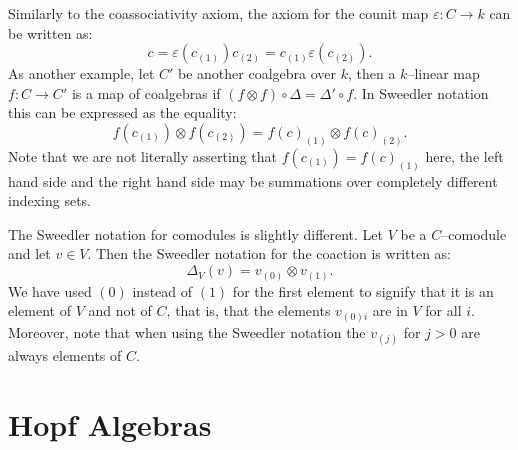\documentclass{article}
\theoremstyle{plain}
\theoremstyle{definition}
\begin{document}
Similarly to the coassociativity axiom, the axiom for the counit map $\varepsilon: C\to k$ can be written as: 
\[
c=\varepsilon(c_{(1)})c_{(2)}=c_{(1)}\varepsilon(c_{(2)}). 
\]
As another example, let $C'$ be another coalgebra over $k$, then a $k$--linear map $f:C\to C'$ is a map of coalgebras if $(f\otimes f)\circ \Delta =\Delta' \circ f$. In Sweedler notation this can be expressed as the equality: 
\[
f(c_{(1)})\otimes f(c_{(2)}) = f(c)_{(1)}\otimes f(c)_{(2)}.
\]
Note that we are not literally asserting that $f(c_{(1)})=f(c)_{(1)}$ here, the left hand side and the right hand side may be summations over completely different indexing sets. 

The Sweedler notation for comodules is slightly different. Let $V$ be a $C$--comodule and let $v\in V$. Then the Sweedler notation for the coaction is written as: 
\[
\Delta_V(v)=v_{(0)} \otimes v_{(1)}.
\]
 We have used $(0)$ instead of $(1)$ for the first element to signify that it is an element of $V$ and not of $C$, that is, that the elements $v_{(0)i}$ are in $V$ for all $i$. Moreover, note that when using the Sweedler notation the $v_{(j)}$ for $j> 0$ are always elements of $C$. 


\pagebreak

\section{Hopf Algebras}\label{Sec: Hopf algebras}
\end{document}

